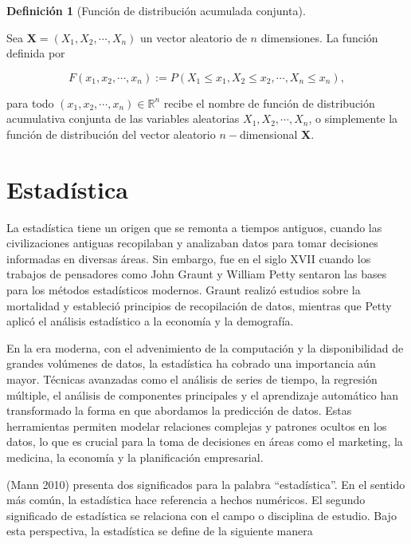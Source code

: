 \documentclass[
  letterpaper,
  DIV=11,
  numbers=noendperiod]{scrreport}
\theoremstyle{plain}
\theoremstyle{definition}
\newtheorem{definition}{Definición}[chapter]
\theoremstyle{definition}
\theoremstyle{plain}
\theoremstyle{remark}
\begin{document}
\begin{definition}[Función de distribución acumulada
conjunta]\protect\hypertarget{def-FDAC}{}\label{def-FDAC}

Sea \(\mathbf X=(X_1,X_2,\cdots, X_n)\) un vector aleatorio de \(n\)
dimensiones. La función definida por

\[ F(x_1,x_2,\cdots,x_n):= P(X_1\leq x_1, X_2\leq x_2,\cdots, X_n\leq x_n), \]

para todo \((x_1,x_2,\cdots,x_n)\in\mathbb R^n\) recibe el nombre de
función de distribución acumulativa conjunta de las variables aleatorias
\(X_1, X_2, \cdots, X_n\), o simplemente la función de distribución del
vector aleatorio \(n-\)dimensional \(\mathbf X\).

\end{definition}

\chapter{Estadística}\label{estaduxedstica}

La estadística tiene un origen que se remonta a tiempos antiguos, cuando
las civilizaciones antiguas recopilaban y analizaban datos para tomar
decisiones informadas en diversas áreas. Sin embargo, fue en el siglo
XVII cuando los trabajos de pensadores como John Graunt y William Petty
sentaron las bases para los métodos estadísticos modernos. Graunt
realizó estudios sobre la mortalidad y estableció principios de
recopilación de datos, mientras que Petty aplicó el análisis estadístico
a la economía y la demografía.

En la era moderna, con el advenimiento de la computación y la
disponibilidad de grandes volúmenes de datos, la estadística ha cobrado
una importancia aún mayor. Técnicas avanzadas como el análisis de series
de tiempo, la regresión múltiple, el análisis de componentes principales
y el aprendizaje automático han transformado la forma en que abordamos
la predicción de datos. Estas herramientas permiten modelar relaciones
complejas y patrones ocultos en los datos, lo que es crucial para la
toma de decisiones en áreas como el marketing, la medicina, la economía
y la planificación empresarial.

(Mann 2010) presenta dos significados para la palabra ``estadística''.
En el sentido más común, la estadística hace referencia a hechos
numéricos. El segundo significado de estadística se relaciona con el
campo o disciplina de estudio. Bajo esta perspectiva, la estadística se
define de la siguiente manera
\end{document}
